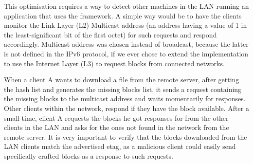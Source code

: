 This optimisation requires a way to detect other machines in the LAN running an application that uses the framework. A simple way would be to have the clients monitor the Link Layer (L2) Multicast address (an address having a value of 1 in the least-significant bit of the first octet) for such requests and respond accordingly. Multicast address was chosen instead of broadcast, because the latter is not defined in the IPv6 protocol, if we ever chose to extend the implementation to use the Internet Layer (L3) to request blocks from connected networks.

When a client A wants to download a file from the remote server, after getting the hash list and generates the missing blocks list, it sends a request containing the missing blocks to the multicast address and waits momentarily for responses. Other clients within the network, respond if they have the block available. After a small time, client A requests the blocks he got responses for from the other clients in the LAN and asks for the ones not found in the network from the remote server. It is very important to verify that the blocks downloaded from the LAN clients match the advertised etag, as a malicious client could easily send specifically crafted blocks as a response to such requests.